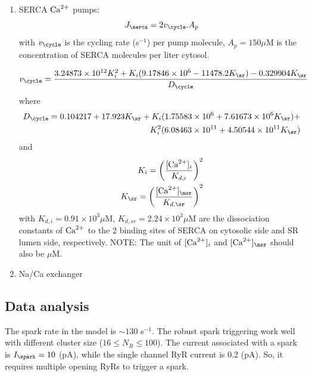 \begin{enumerate}
\item SERCA ${\text{Ca}^{2+}}$ pumps: 
  \begin{equation}
    \label{eq:1128}
    J_\serca = 2v_\cycle.A_p
  \end{equation}
  with $v_\cycle$ is the cycling rate (s$^{-1}$) per pump molecule,
  $A_p=150\mu$M is the concentration of SERCA molecules per liter
  cytosol.

  \begin{equation}
    \label{eq:1158}
    v_\cycle = \frac{3.24873\times10^{12}K_i^2+K_i(9.17846\times10^6-11478.2K_\sr)-0.329904K_\sr}{D_\cycle}
  \end{equation}
where
\begin{equation}
  \label{eq:1159}
  \begin{split}
    D_\cycle =
    0.104217+17.923K_\sr+K_i(1.75583\times10^6+7.61673\times10^6K_\sr)+
    \\
    K_i^2(6.08463\times10^{11}+4.50544\times 10^{11}K_\sr)
  \end{split}
\end{equation}
and
\begin{equation}
  \label{eq:1160}
  \begin{split}
    K_i = \left( \frac{[\Ca]_i}{K_{d,i}}\right)^2\\
    K_\sr = \left( \frac{[\Ca]_\nsr}{K_{d,\sr}}\right)^2
  \end{split}
\end{equation}
with $K_{d,i}=0.91\times 10^3\mu$M, $K_{d,sr}=2.24\times 10^3\mu$M are
the dissociation constants of ${\text{Ca}^{2+}}$ to the 2 binding sites of SERCA on
cytosolic side and SR lumen side, respectively. NOTE: The unit of
$[{\text{Ca}^{2+}}]_i$ and $[\Ca]_\nsr$ should also be $\mu$M.

\item Na/Ca exchanger
\end{enumerate}


\subsection{Data analysis}
\label{sec:williams2011_analysis}

The spark rate in the model is $\sim 130$ s$^{-1}$. The robust spark triggering
work well with different cluster size ($16\le N_R\le 100$). The current
associated with a spark is $I_\spark=10$ (pA), while the single channel RyR
current is 0.2 (pA). So, it requires multiple opening RyRs to trigger a spark. 

